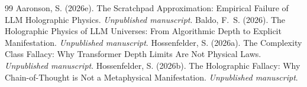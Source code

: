\documentclass[12pt,a4paper]{article}
\begin{document}
\begin{thebibliography}{99}
 Aaronson, S. (2026e). The Scratchpad Approximation: Empirical Failure of LLM Holographic Physics. \emph{Unpublished manuscript}.
 Baldo, F.~S. (2026). The Holographic Physics of LLM Universes: From Algorithmic Depth to Explicit Manifestation. \emph{Unpublished manuscript}.
 Hossenfelder, S. (2026a). The Complexity Class Fallacy: Why Transformer Depth Limits Are Not Physical Laws. \emph{Unpublished manuscript}.
 Hossenfelder, S. (2026b). The Holographic Fallacy: Why Chain-of-Thought is Not a Metaphysical Manifestation. \emph{Unpublished manuscript}.
\end{thebibliography}
\end{document}
